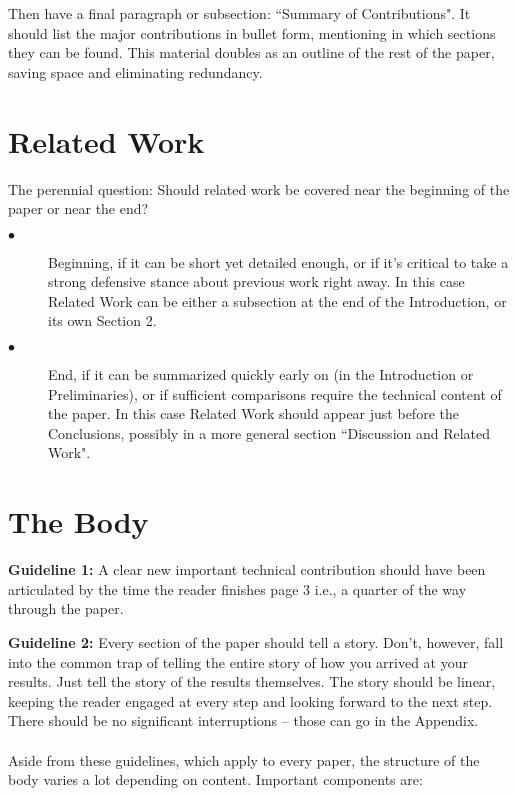 \documentclass[10pt,twocolumn]{article}
\begin{document}
Then have a final paragraph or subsection: ``Summary of Contributions". It should list the major contributions in bullet form, mentioning in which sections they can be found. This material doubles as an outline of the rest of the paper, saving space and eliminating redundancy.

\section{Related Work}

The perennial question: Should related work be covered near the beginning of the paper or near the end?

\begin{description}
  \item[$\bullet$]  Beginning, if it can be short yet detailed enough, or if it's critical to take a strong defensive stance about previous work right away. In this case Related Work can be either a subsection at the end of the Introduction, or its own Section 2.
  \item[$\bullet$]  End, if it can be summarized quickly early on (in the Introduction or Preliminaries), or if sufficient comparisons require the technical content of the paper. In this case Related Work should appear just before the Conclusions, possibly in a more general section ``Discussion and Related Work".
\end{description}

\section{The Body}

\textbf{Guideline 1:} A clear new important technical contribution should have been articulated by the time the reader finishes page 3 i.e., a quarter of the way through the paper.

\textbf{Guideline 2:} Every section of the paper should tell a story. Don't, however, fall into the common trap of telling the entire story of how you arrived at your results. Just tell the story of the results themselves. The story should be linear, keeping the reader engaged at every step and looking forward to the next step. There should be no significant interruptions -- those can go in the Appendix.
\\
\\
Aside from these guidelines, which apply to every paper, the structure of the body varies a lot depending on content. Important components are:
\end{document}

